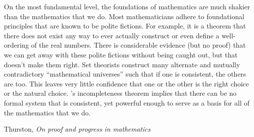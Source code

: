 \documentclass[11pt,openany]{article}
\begin{document}
\epigraph{On the most fundamental level, the foundations of mathematics are much shakier
than the mathematics that we do. Most mathematicians adhere to foundational
principles that are known to be polite fictions. For example, it is a theorem that
there does not exist any way to ever actually construct or even define a well-ordering
of the real numbers. There is considerable evidence (but no proof) that we can get
away with these polite fictions without being caught out, but that doesn’t make
them right. Set theorists construct many alternate and mutually contradictory
“mathematical universes” such that if one is consistent, the others are too. This
leaves very little confidence that one or the other is the right choice or the natural
choice. {\Godel}’s incompleteness theorem implies that there can be no formal system
that is consistent, yet powerful enough to serve as a basis for all of the mathematics
that we do.}%
{Thurston, \textit{On proof and progress in mathematics}~\cite{thurston1994proof}}

\pagebreak
\end{document}
